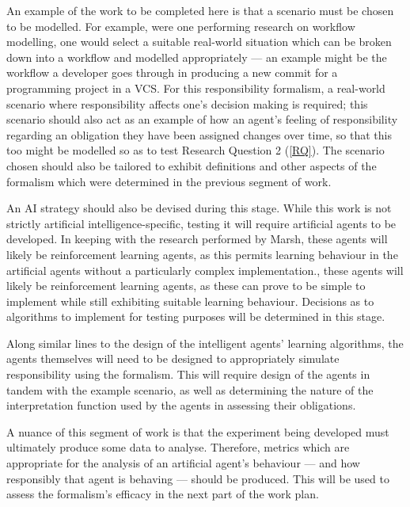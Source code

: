 An example of the work to be completed here is that a scenario must be chosen to be modelled. For example, were one performing research on workflow modelling, one would select a suitable real-world situation which can be broken down into a workflow and modelled appropriately --- an example might be the workflow a developer goes through in producing a new commit for a programming project in a VCS\@. For this responsibility formalism, a real-world scenario where responsibility affects one's decision making is required; this scenario should also act as an example of how an agent's feeling of responsibility regarding an obligation they have been assigned changes over time, so that this too might be modelled so as to test Research Question 2 (\cref{RQ}). The scenario chosen should also be tailored to exhibit definitions and other aspects of the formalism which were determined in the previous segment of work.\par

An AI strategy should also be devised during this stage. While this work is not strictly artificial intelligence-specific, testing it will require artificial agents to be developed. In keeping with the research performed by Marsh\cite{Marsh1994FormalisingConcept}, these agents will likely be reinforcement learning agents, as this permits learning behaviour in the artificial agents without a particularly complex implementation., these agents will likely be reinforcement learning agents, as these can prove to be simple to implement while still exhibiting suitable learning behaviour. Decisions as to algorithms to implement for testing purposes will be determined in this stage.\par

Along similar lines to the design of the intelligent agents' learning algorithms, the agents themselves will need to be designed to appropriately simulate responsibility using the formalism. This will require design of the agents in tandem with the example scenario, as well as determining the nature of the interpretation function used by the agents in assessing their obligations.\par

A nuance of this segment of work is that the experiment being developed must ultimately produce some data to analyse. Therefore, metrics which are appropriate for the analysis of an artificial agent's behaviour --- and how responsibly that agent is behaving --- should be produced. This will be used to assess the formalism's efficacy in the next part of the work plan.\par

